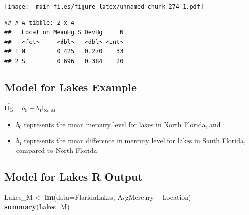 \documentclass[]{book}
\newenvironment{Shaded}{\begin{snugshade}}{\end{snugshade}}
\newcommand{\KeywordTok}[1]{\textcolor[rgb]{0.13,0.29,0.53}{\textbf{#1}}}
\newcommand{\DataTypeTok}[1]{\textcolor[rgb]{0.13,0.29,0.53}{#1}}
\newcommand{\StringTok}[1]{\textcolor[rgb]{0.31,0.60,0.02}{#1}}
\newcommand{\OperatorTok}[1]{\textcolor[rgb]{0.81,0.36,0.00}{\textbf{#1}}}
\newcommand{\NormalTok}[1]{#1}
\providecommand{\tightlist}{%
  \setlength{\itemsep}{0pt}\setlength{\parskip}{0pt}}
\begin{document}
\texttt{[image: \_main\_files/figure-latex/unnamed-chunk-274-1.pdf]}

\begin{Shaded}
\end{Shaded}

\begin{verbatim}
## # A tibble: 2 x 4
##   Location MeanHg StDevHg     N
##   <fct>     <dbl>   <dbl> <int>
## 1 N         0.425   0.270    33
## 2 S         0.696   0.384    20
\end{verbatim}

\subsection{Model for Lakes Example}\label{model-for-lakes-example}

\(\widehat{\text{Hg}} = b_0 +b_1\text{I}_{\text{South}}\)

\begin{itemize}
\tightlist
\item
  \(b_0\) represents the mean mercury level for lakes in North Florida,
  and\\
\item
  \(b_1\) represents the mean difference in mercury level for lakes in
  South Florida, compared to North Florida
\end{itemize}

\subsection{Model for Lakes R Output}\label{model-for-lakes-r-output-1}

\begin{Shaded}
\begin{Highlighting}[]
\NormalTok{Lakes_M <-}\StringTok{ }\KeywordTok{lm}\NormalTok{(}\DataTypeTok{data=}\NormalTok{FloridaLakes, AvgMercury }\OperatorTok{~}\StringTok{ }\NormalTok{Location)}
\KeywordTok{summary}\NormalTok{(Lakes_M)}
\end{Highlighting}
\end{Shaded}
\end{document}
